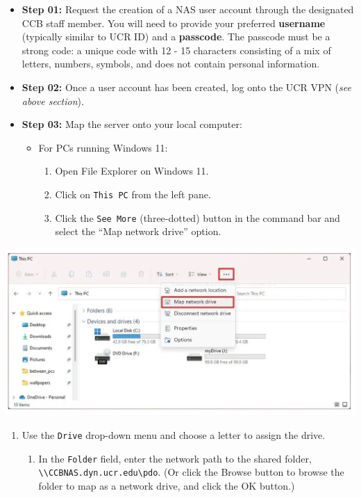 \documentclass[
]{book}
\providecommand{\tightlist}{%
  \setlength{\itemsep}{0pt}\setlength{\parskip}{0pt}}
\begin{document}
\begin{itemize}
\item
  \textbf{Step 01:} Request the creation of a NAS user account through the designated CCB staff member. You will need to provide your preferred \textbf{username} (typically similar to UCR ID) and a \textbf{passcode}. The passcode must be a strong code: a unique code with 12 - 15 characters consisting of a mix of letters, numbers, symbols, and does not contain personal information.
\item
  \textbf{Step 02:} Once a user account has been created, log onto the UCR VPN (\emph{see above section}).
\item
  \textbf{Step 03:} Map the server onto your local computer:

  \begin{itemize}
  \tightlist
  \item
    For PCs running Windows 11:

    \begin{enumerate}
    \def\labelenumi{\arabic{enumi}.}
    \tightlist
    \item
      Open File Explorer on Windows 11.
    \item
      Click on \texttt{This\ PC} from the left pane.
    \item
      Click the \texttt{See\ More} (three-dotted) button in the command bar and select the ``Map network drive'' option.
    \end{enumerate}
  \end{itemize}
\end{itemize}

\begin{flushleft}\includegraphics{images/nas_map} \end{flushleft}

\begin{enumerate}
\def\labelenumi{\arabic{enumi}.}
\setcounter{enumi}{3}
\tightlist
\item
  Use the \texttt{Drive} drop-down menu and choose a letter to assign the drive.

  \begin{enumerate}
  \def\labelenumii{\arabic{enumii}.}
  \setcounter{enumii}{4}
  \tightlist
  \item
    In the \texttt{Folder} field, enter the network path to the shared folder, \texttt{\textbackslash{}\textbackslash{}CCBNAS.dyn.ucr.edu\textbackslash{}pdo}. (Or click the Browse button to browse the folder to map as a network drive, and click the OK button.)
  \end{enumerate}
\end{enumerate}
\end{document}

